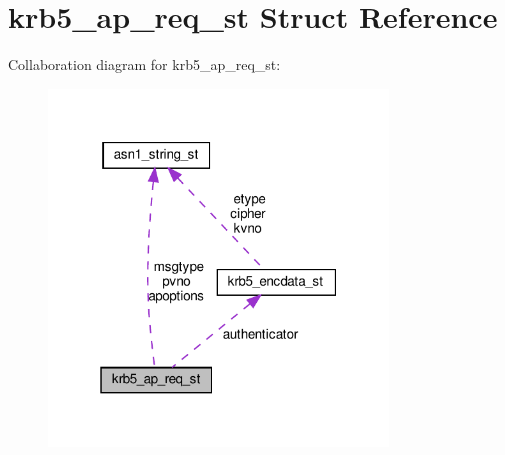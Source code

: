 \hypertarget{structkrb5__ap__req__st}{}\section{krb5\+\_\+ap\+\_\+req\+\_\+st Struct Reference}
\label{structkrb5__ap__req__st}


Collaboration diagram for krb5\+\_\+ap\+\_\+req\+\_\+st\+:
\nopagebreak
\begin{figure}[H]
\begin{center}
\leavevmode
\includegraphics[width=256pt]{structkrb5__ap__req__st__coll__graph}
\end{center}
\end{figure}
